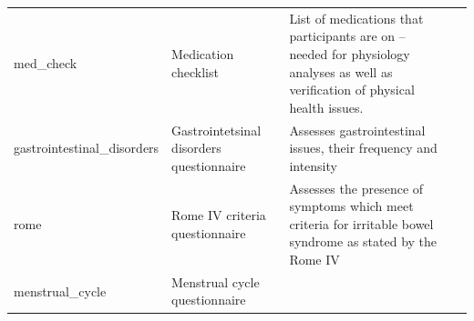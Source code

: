 \documentclass[]{book}
\begin{document}
\begin{longtable}[]{@{}llll@{}}
\begin{minipage}[t]{0.22\columnwidth}
med\_check\strut
\end{minipage} & \begin{minipage}[t]{0.27\columnwidth}\raggedright
Medication checklist\strut
\end{minipage} & \begin{minipage}[t]{0.22\columnwidth}\raggedright
List of medications that participants are on -- needed for physiology analyses as well as verification of physical health issues.\strut
\end{minipage} & \begin{minipage}[t]{0.18\columnwidth}\raggedright
\strut
\end{minipage}\tabularnewline
\begin{minipage}[t]{0.22\columnwidth}\raggedright
gastrointestinal\_disorders\strut
\end{minipage} & \begin{minipage}[t]{0.27\columnwidth}\raggedright
Gastrointetsinal disorders questionnaire\strut
\end{minipage} & \begin{minipage}[t]{0.22\columnwidth}\raggedright
Assesses gastrointestinal issues, their frequency and intensity\strut
\end{minipage} & \begin{minipage}[t]{0.18\columnwidth}\raggedright
\strut
\end{minipage}\tabularnewline
\begin{minipage}[t]{0.22\columnwidth}\raggedright
rome\strut
\end{minipage} & \begin{minipage}[t]{0.27\columnwidth}\raggedright
Rome IV criteria questionnaire\strut
\end{minipage} & \begin{minipage}[t]{0.22\columnwidth}\raggedright
Assesses the presence of symptoms which meet criteria for irritable bowel syndrome as stated by the Rome IV\strut
\end{minipage} & \begin{minipage}[t]{0.18\columnwidth}\raggedright
\strut
\end{minipage}\tabularnewline
\begin{minipage}[t]{0.22\columnwidth}\raggedright
menstrual\_cycle\strut
\end{minipage} & \begin{minipage}[t]{0.27\columnwidth}\raggedright
Menstrual cycle questionnaire\strut
\end{minipage} & \begin{minipage}[t]{0.22\columnwidth}\raggedright

\end{minipage}
\end{longtable}
\end{document}
